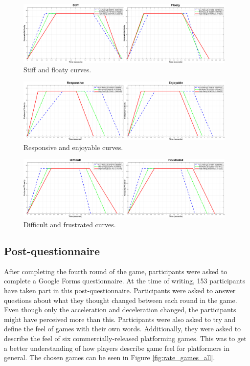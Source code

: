 \begin{figure}[!htb]
\centering
\includegraphics[width=0.97\textwidth]{Pics/Curves/stiff_floaty}
\caption{Stiff and floaty curves.}
\label{fig:stiff_floaty}
\end{figure}

\begin{figure}[!htb]
\centering
\includegraphics[width=0.97\textwidth]{Pics/Curves/responsive_enjoyable}
\caption{Responsive and enjoyable curves.}
\label{fig:responsive_enjoyable}
\end{figure}

\begin{figure}[!htb]
\centering
\includegraphics[width=0.97\textwidth]{Pics/Curves/difficult_frustrated}
\caption{Difficult and frustrated curves.}
\label{fig:difficult_frustrated}
\end{figure}

\subsection{Post-questionnaire}
After completing the fourth round of the game, participants were asked to complete a Google Forms questionnaire. At the time of writing, 153 participants have taken part in this post-questionnaire. Participants were asked to answer questions about what they thought changed between each round in the game. Even though only the acceleration and deceleration changed, the participants might have perceived more than this. Participants were also asked to try and define the feel of games with their own words. Additionally, they were asked to describe the feel of six commercially-released platforming games. This was to get a better understanding of how players describe game feel for platformers in general. The chosen games can be seen in Figure \ref{fig:rate_games_all}.

